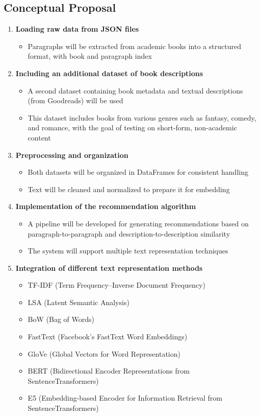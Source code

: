 \documentclass[\myFontSize,a4paper,oneside,hidelinks]{article}
\begin{document}
\subsection{Conceptual Proposal}
\begin{enumerate}
    \item \textbf{Loading raw data from JSON files}
    \begin{itemize}
        \item Paragraphs will be extracted from academic books into a structured format, with book and paragraph index
    \end{itemize}

    \item \textbf{Including an additional dataset of book descriptions}
    \begin{itemize}
        \item A second dataset containing book metadata and textual descriptions (from Goodreads) will be used
        \item This dataset includes books from various genres such as fantasy, comedy, and romance, with the goal of testing on short-form, non-academic content
    \end{itemize}

    \item \textbf{Preprocessing and organization}
    \begin{itemize}
        \item Both datasets will be organized in DataFrames for consistent handling
        \item Text will be cleaned and normalized to prepare it for embedding
    \end{itemize}
    
    \item \textbf{Implementation of the recommendation algorithm}
    \begin{itemize}
        \item A pipeline will be developed for generating recommendations based on paragraph-to-paragraph and description-to-description similarity
        \item The system will support multiple text representation techniques
    \end{itemize}

    \item \textbf{Integration of different text representation methods}
    \begin{itemize}
	\item TF-IDF (Term Frequency–Inverse Document Frequency)
	\item LSA (Latent Semantic Analysis)
	\item BoW (Bag of Words)
	\item FastText (Facebook's FastText Word Embeddings)
	\item GloVe (Global Vectors for Word Representation)
	\item BERT (Bidirectional Encoder Representations from SentenceTransformers)
	\item E5 (Embedding-based Encoder for Information Retrieval from SentenceTransformers)
    \end{itemize}



\end{enumerate}
\end{document}
